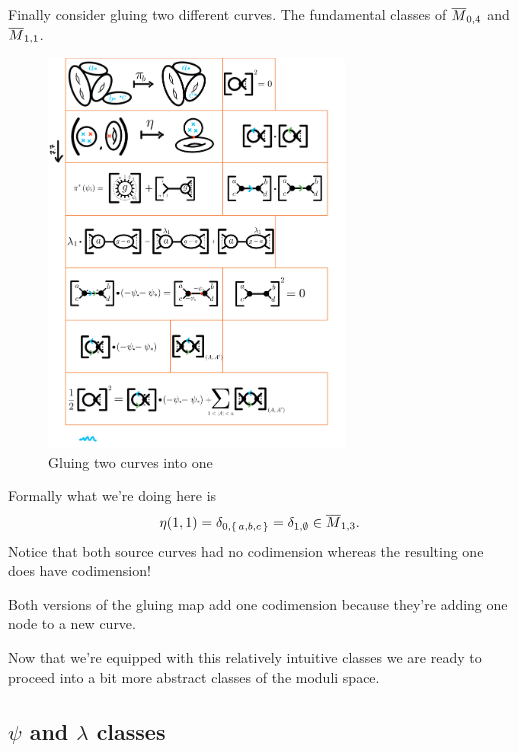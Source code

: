 \documentclass[12pt]{memoir}
\begin{document}
\begin{Ex}
    Finally consider gluing two different curves. The fundamental classes of $\overline{M}_{0,4}$ and $\overline{M}_{1,1}$.
    \begin{figure}[h!]
        \centering
        \includegraphics[width=0.7\textwidth, trim= 1.3cm 20.8cm 9cm 3.9cm,clip]{../figs/FigsDNnotability2.pdf}
        \caption{Gluing two curves into one}
        \label{fig:glue-two-into-divisor}
    \end{figure}
    Formally what we're doing here is 
    $$\eta(1,1)=\delta_{0,\{\,a,b,c\,\}}=\delta_{1,\emptyset}\in\overline{M}_{1,3}.$$
    Notice that both source curves had no codimension whereas the resulting one does have codimension!
\end{Ex}

\begin{Rmk}
    Both versions of the gluing map add one codimension because they're adding one node to a new curve.
\end{Rmk}

Now that we're equipped with this relatively intuitive classes we are ready to proceed into a bit more abstract classes of the moduli space.

\subsection{$\psi$ and $\lambda$ classes}
\end{document}
